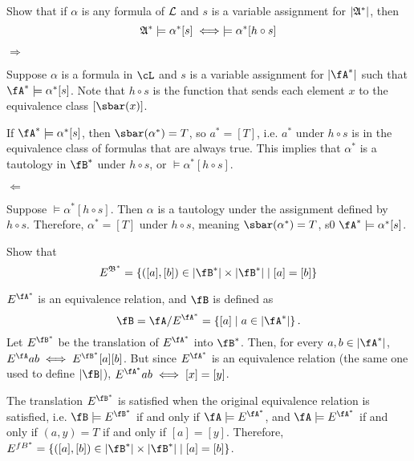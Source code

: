 \begin{problem}
\begin{enumalph}
    \item Show that if $\alpha$ is any formula of $\mathcal{L}$ and $s$
      is a variable assignment for $\lvert\mathfrak{A}^*\rvert$, then
      \[ \mathfrak{A}^* \models \alpha^* [s] \;\Longleftrightarrow\; \models \alpha^* [h \circ s] \]
      \begin{Answer}
        $\Longrightarrow$

        \step
        Suppose $\alpha$ is a formula in $\cL$ and $s$ is a variable assignment
        for $\abs{\fA^*}$ such that $\fA^* \models \alpha^* [s]$.
        Note that $h \circ s$ is the function that sends each element $x$
        to the equivalence class $[\sbar(x)]$.

        If $\fA^* \models \alpha^* [s]$, then $\sbar(\alpha^*) = T$,
        so $a^* = [T]$, i.e.  $a^*$ under $h \circ s$ is in the equivalence class
        of formulas that are always true.
        This implies that $\alpha^*$ is a tautology in $\fB^*$ under
        $h \circ s$, or $\models \alpha^* [h \circ s]$.

        $\Longleftarrow$

        \step
        Suppose $\models \alpha^* [h \circ s]$.
        Then $\alpha$ is a tautology under the assignment defined by
        $h \circ s$. Therefore, $\alpha^* = [T]$ under $h \circ s$,
        meaning $\sbar(\alpha^*) = T$, s0 $\fA^* \models \alpha^* [s]$.
      \end{Answer}

    \item Show that 
      \[ E^{\frakB^*} = \set{([a], [b]) \in \abs{\fB^*} \times \abs{\fB^*}
          \mid [a] = [b]} \]
      \begin{Answer}
        $E^{\fA^*}$ is an equivalence relation, and $\fB$ is defined as
        \[ \fB = \fA / E^{\fA^*} = \set{ [a] \mid a \in \abs{\fA^*}}. \]
        Let $E^{\fB^*}$ be the translation of $E^{\fA^*}$ into $\fB^*$.
        Then, for every $a, b \in \abs{\fA^*}$,
        $E^\fA a b \Iff E^{\fB^*} [a] [b]$.
        But since $E^{\fA^*}$ is an equivalence relation
        (the same one used to define $\abs{\fB}$),
        $E^{\fA^*} a b \Iff [x] = [y]$.
        
        \step
        The translation $E^{\fB^*}$ is satisfied when the original equivalence
        relation is satisfied, i.e. $\fB \models E^{\fB^*}$
        if and only if $\fA \models E^{\fA^*}$,
        and $\fA \models E^{\fA^*}$ if and only if
        $(a, y) = T$ if and only if $[a] = [y]$.
        Therefore, $E^{fB^*} = \set{([a], [b]) \in \abs{\fB^*} \times \abs{\fB^*}
          \mid [a] = [b]}$.

      \end{Answer}
  \end{enumalph}
\end{problem}
